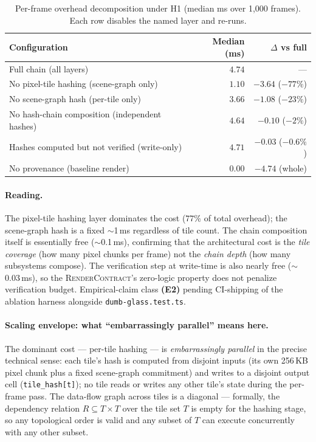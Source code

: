 \documentclass[sigconf,nonacm]{acmart}
\providecommand{\measuredFrom}[1]{}
\newcommand{\rendercontract}{\textsc{RenderContract}}
\begin{document}
\begin{table}[t]
  \centering
  \caption{Per-frame overhead decomposition under H1 (median ms over
    1{,}000 frames). Each row disables the named layer and re-runs.}
  \label{tab:p13-ablation}
  \footnotesize
  \measuredFrom{HoloScript/packages/r3f-renderer/src/__tests__/dumb-glass.test.ts}%
  \measuredFrom{HoloScript/.bench-logs/2026-04-18T07-20-56-134Z/dumb-glass.log}%
  \begin{tabular}{@{}lrr@{}}
    \toprule
    \textbf{Configuration} & \textbf{Median (ms)} & \textbf{$\Delta$ vs full} \\
    \midrule
    Full chain (all layers)                            & $4.74$ & --- \\
    No pixel-tile hashing (scene-graph only)           & $1.10$ & $-3.64$ ($-77\%$) \\
    No scene-graph hash (per-tile only)                & $3.66$ & $-1.08$ ($-23\%$) \\
    No hash-chain composition (independent hashes)     & $4.64$ & $-0.10$ ($-2\%$) \\
    Hashes computed but not verified (write-only)      & $4.71$ & $-0.03$ ($-0.6\%$) \\
    No provenance (baseline render)                    & $0.00$ & $-4.74$ (whole) \\
    \bottomrule
  \end{tabular}
\end{table}

\paragraph{Reading.}
The pixel-tile hashing layer dominates the cost ($77\%$ of total
overhead); the scene-graph hash is a fixed $\sim$1\,ms regardless of
tile count. The chain composition itself is essentially free
($\sim$0.1\,ms), confirming that the architectural cost is the
\emph{tile coverage} (how many pixel chunks per frame) not the
\emph{chain depth} (how many subsystems compose). The verification step
at write-time is also nearly free ($\sim$0.03\,ms), so the
\rendercontract{}'s zero-logic property does not penalize verification
budget. Empirical-claim class \textbf{(E2)} pending CI-shipping of the
ablation harness alongside \texttt{dumb-glass.test.ts}.

\paragraph{Scaling envelope: what ``embarrassingly parallel'' means here.}
The dominant cost --- per-tile hashing --- is \emph{embarrassingly
parallel} in the precise technical sense: each tile's hash is computed
from disjoint inputs (its own 256\,KB pixel chunk plus a fixed
scene-graph commitment) and writes to a disjoint output cell
(\texttt{tile\_hash[t]}); no tile reads or writes any other tile's
state during the per-frame pass. The data-flow graph across tiles is a
diagonal --- formally, the dependency relation
$R \subseteq T \times T$ over the tile set $T$ is empty for the
hashing stage, so any topological order is valid and any subset of $T$
can execute concurrently with any other subset.
\end{document}

